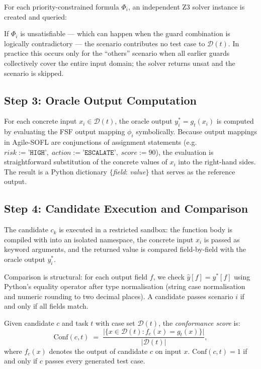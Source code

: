 For each priority-constrained formula $\Phi_i$, an independent Z3 solver
instance is created and queried:


If $\Phi_i$ is unsatisfiable — which can happen when the guard combination is
logically contradictory — the scenario contributes no test case to
$\mathcal{D}(t)$.  In practice this occurs only for the ``others'' scenario
when all earlier guards collectively cover the entire input domain; the
solver returns \textsf{unsat} and the scenario is skipped.

\subsection{Step 3: Oracle Output Computation}
\label{subsec:method:oracle-compute}

For each concrete input $x_i \in \mathcal{D}(t)$, the oracle output
$y_i^* = g_t(x_i)$ is computed by evaluating the FSF output mapping
$\phi_i$ symbolically.  Because output mappings in Agile-SOFL are conjunctions
of assignment statements (e.g.\ $\mathit{risk} := \texttt{'HIGH'},\;
\mathit{action} := \texttt{'ESCALATE'},\; \mathit{score} := 90$), the
evaluation is straightforward substitution of the concrete values of
$x_i$ into the right-hand sides.  The result is a Python dictionary
$\{$\textit{field}: \textit{value}$\}$ that serves as the reference output.

\subsection{Step 4: Candidate Execution and Comparison}
\label{subsec:method:exec}

The candidate $c_k$ is executed in a restricted sandbox: the function body is
compiled with  into an isolated namespace, the concrete input
$x_i$ is passed as keyword arguments, and the returned value is compared
field-by-field with the oracle output $y_i^*$.

Comparison is structural: for each output field $f$, we check
$\hat{y}[f] = y^*[f]$ using Python's equality operator after type
normalisation (string case normalisation and numeric rounding to two decimal
places).  A candidate passes scenario $i$ if and only if all fields match.

\begin{definition}
\label{def:conf-score}
Given candidate $c$ and task $t$ with case set $\mathcal{D}(t)$, the
\emph{conformance score} is:
\begin{equation}
  \mathrm{Conf}(c, t) \;=\;
    \frac{\bigl|\{x \in \mathcal{D}(t) : f_c(x) = g_t(x)\}\bigr|}
         {|\mathcal{D}(t)|},
  \label{eq:conf-score}
\end{equation}
where $f_c(x)$ denotes the output of candidate $c$ on input $x$.
$\mathrm{Conf}(c, t) = 1$ if and only if $c$ passes every generated test case.
\end{definition}

